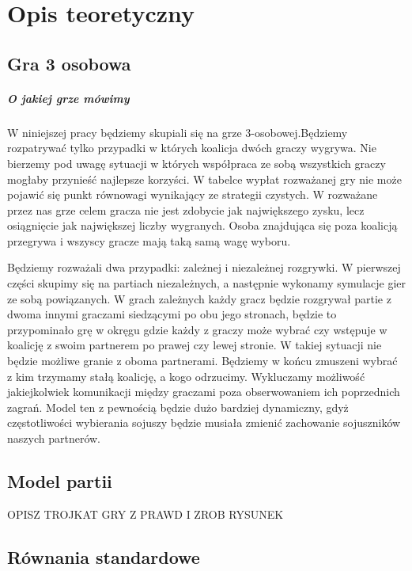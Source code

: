 \chapter{Opis teoretyczny}
\label{cha:opis_teor}

\section{Gra 3 osobowa}
\label{sec:3_gra}

\paragraph{O jakiej grze mówimy}

W niniejszej pracy będziemy skupiali się na grze 3-osobowej.Będziemy rozpatrywać tylko przypadki w których koalicja dwóch graczy wygrywa. Nie bierzemy pod uwagę sytuacji w których współpraca ze sobą wszystkich graczy mogłaby przynieść najlepsze korzyści. W tabelce wypłat rozważanej gry nie może pojawić się punkt równowagi wynikający ze strategii czystych. W rozważane przez nas grze celem gracza nie jest zdobycie jak największego zysku, lecz osiągnięcie jak największej liczby wygranych. Osoba znajdująca się poza koalicją przegrywa i wszyscy gracze mają taką samą wagę wyboru.

Będziemy rozważali dwa przypadki: zależnej i niezależnej rozgrywki. W pierwszej części skupimy się na partiach niezależnych, a następnie wykonamy symulacje gier ze sobą powiązanych. W grach zależnych każdy gracz będzie rozgrywał partie z dwoma innymi graczami siedzącymi po obu jego stronach, będzie to przypominało grę w okręgu gdzie każdy z graczy może wybrać czy wstępuje w koalicję z swoim partnerem po prawej czy lewej stronie. W takiej sytuacji nie będzie możliwe granie z oboma partnerami. Będziemy w końcu zmuszeni wybrać z kim trzymamy stałą koalicję, a kogo odrzucimy. Wykluczamy możliwość jakiejkolwiek komunikacji między graczami poza obserwowaniem ich poprzednich zagrań. Model ten z pewnością będzie dużo bardziej dynamiczny, gdyż częstotliwości wybierania sojuszy będzie musiała zmienić zachowanie sojuszników naszych partnerów.

\section{Model partii}
OPISZ TROJKAT GRY Z PRAWD I ZROB RYSUNEK

\section{Równania standardowe}
\label{sec:r_stand}

